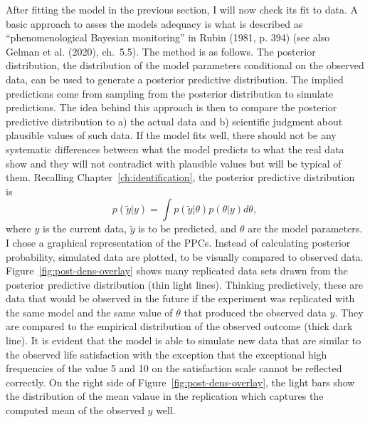 \documentclass[a4, 12pt]{article}
\begin{document}
\label{sec:validation}
After fitting the model in the previous section, I will now check its fit to data. A basic approach to asses the models adequacy is what is described as ``phenomenological Bayesian monitoring'' in Rubin (1981, p. 394) (see also Gelman et al. (2020), ch.~5.5). The method is as follows. The posterior distribution, the distribution of the model parameters conditional on the observed data, can be used to generate a posterior predictive distribution. The implied predictions come from sampling from the posterior distribution to simulate predictions. The idea behind this approach is then to compare the posterior predictive distribution to a) the actual data and b) scientific judgment about plausible values of such data. If the model fits well, there should not be any systematic differences between what the model predicts to what the real data show and they will not contradict with plausible values but will be typical of them. Recalling Chapter~\ref{ch:identification}, the posterior predictive distribution is
\[p(\tilde{y}|y) =\int p(\tilde{y}|\theta)p(\theta|y)d\theta,\]
where \(y\) is the current data, \(\tilde y\) is to be predicted, and \(\theta\) are the model parameters.
I chose a graphical representation of the PPCs. Instead of calculating posterior probability, simulated data are plotted, to be visually compared to observed data.
Figure~\ref{fig:post-dens-overlay} shows many replicated data sets drawn from the posterior predictive distribution (thin light lines). Thinking predictively, these are data that would be observed in the future if the experiment was replicated with the same model and the same value of \(\theta\) that produced the observed data \(y\). They are compared to the empirical distribution of the observed outcome (thick dark line). It is evident that the model is able to simulate new data that are similar to the observed life satisfaction with the exception that the exceptional high frequencies of the value 5 and 10 on the satisfaction scale cannot be reflected correctly.
On the right side of Figure~\ref{fig:post-dens-overlay}, the light bars show the distribution of the mean valaue in the replication which captures the computed mean of the observed \(y\) well.
\end{document}
